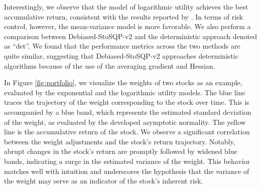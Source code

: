 \documentclass[aos]{imsart}
\numberwithin{equation}{section}
\theoremstyle{plain}
\begin{document}
Interestingly, we observe that the model of logarithmic utility achieves the best accumulative return, consistent with the results reported by \cite{du2023high}. In terms of risk control, however, the mean-variance model is more favorable. We also perform a comparison between Debiased-StoSQP-v2 and the deterministic approach denoted as ``det''. 
We found that the performance metrics across the two methods are quite similar, suggesting that Debiased-StoSQP-v2 approaches deterministic algorithms because of the use of the averaging gradient and Hessian.



In Figure \ref{fig:portfolio}, we visualize the weights of two stocks as an example, evaluated by the exponential and the logarithmic utility models.
The blue line traces the trajectory of the weight corresponding to the stock over time. This is accompanied by a blue band, which represents the estimated standard deviation of the weight, as evaluated by the developed asymptotic normality. The yellow line is the accumulative return of the stock. 
We observe a significant correlation between the weight adjustments and the stock's return trajectory.
Notably, abrupt changes in the stock's return are promptly followed by widened blue bands, indicating a surge in the estimated variance of the weight.
This behavior matches well with intuition and underscores the hypothesis that the variance of the weight may serve as an indicator of the stock's inherent risk.
\end{document}
